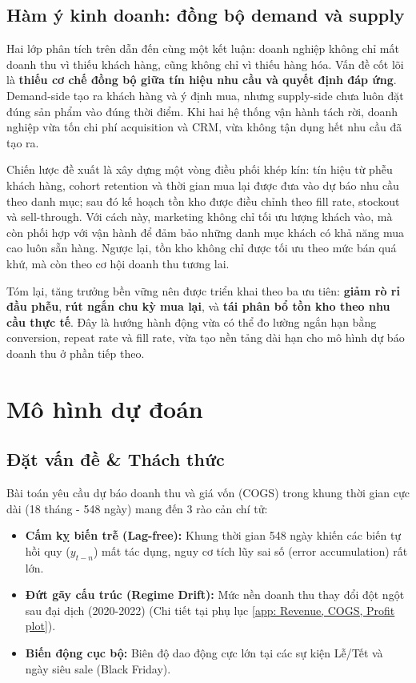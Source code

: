 \documentclass[10pt,a4paper]{article}
\begin{document}
\subsection{Hàm ý kinh doanh: đồng bộ demand và supply}

Hai lớp phân tích trên dẫn đến cùng một kết luận: doanh nghiệp không chỉ mất doanh thu vì thiếu khách hàng, cũng không chỉ vì thiếu hàng hóa. Vấn đề cốt lõi là \textbf{thiếu cơ chế đồng bộ giữa tín hiệu nhu cầu và quyết định đáp ứng}. Demand-side tạo ra khách hàng và ý định mua, nhưng supply-side chưa luôn đặt đúng sản phẩm vào đúng thời điểm. Khi hai hệ thống vận hành tách rời, doanh nghiệp vừa tốn chi phí acquisition và CRM, vừa không tận dụng hết nhu cầu đã tạo ra.

Chiến lược đề xuất là xây dựng một vòng điều phối khép kín: tín hiệu từ phễu khách hàng, cohort retention và thời gian mua lại được đưa vào dự báo nhu cầu theo danh mục; sau đó kế hoạch tồn kho được điều chỉnh theo fill rate, stockout và sell-through. Với cách này, marketing không chỉ tối ưu lượng khách vào, mà còn phối hợp với vận hành để đảm bảo những danh mục khách có khả năng mua cao luôn sẵn hàng. Ngược lại, tồn kho không chỉ được tối ưu theo mức bán quá khứ, mà còn theo cơ hội doanh thu tương lai.

Tóm lại, tăng trưởng bền vững nên được triển khai theo ba ưu tiên: \textbf{giảm rò rỉ đầu phễu}, \textbf{rút ngắn chu kỳ mua lại}, và \textbf{tái phân bổ tồn kho theo nhu cầu thực tế}. Đây là hướng hành động vừa có thể đo lường ngắn hạn bằng conversion, repeat rate và fill rate, vừa tạo nền tảng dài hạn cho mô hình dự báo doanh thu ở phần tiếp theo.
\section{Mô hình dự đoán}
\subsection{Đặt vấn đề \& Thách thức}
Bài toán yêu cầu dự báo doanh thu và giá vốn (COGS) trong khung thời gian cực dài (18 tháng - 548 ngày) mang đến 3 rào cản chí tử:
\begin{itemize}[leftmargin=*, nosep]
  \item \textbf{Cấm kỵ biến trễ (Lag-free):} Khung thời gian 548 ngày khiến các biến tự hồi quy ($y_{t-n}$) mất tác dụng, nguy cơ tích lũy sai số (error accumulation) rất lớn.
  \item \textbf{Đứt gãy cấu trúc (Regime Drift):} Mức nền doanh thu thay đổi đột ngột sau đại dịch (2020-2022) (Chi tiết tại phụ lục \ref{app: Revenue, COGS, Profit plot}).
  \item \textbf{Biến động cục bộ:} Biên độ dao động cực lớn tại các sự kiện Lễ/Tết và ngày siêu sale (Black Friday).
\end{itemize}
\end{document}
